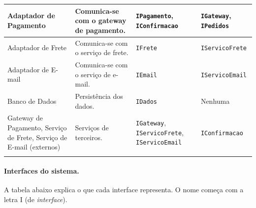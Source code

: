 \documentclass[12pt,a4paper]{article}
\begin{document}
{{\begin{xltabular}{\textwidth}{>{\raggedright\arraybackslash}p{2.7cm}|>{\raggedright\arraybackslash}X|>{\raggedright\arraybackslash}p{2.6cm}|>{\raggedright\arraybackslash}p{3.0cm}}
Adaptador de Pagamento & Comunica-se com o gateway de pagamento. & \texttt{IPagamento}, \texttt{IConfirmacao} & \texttt{IGateway}, \texttt{IPedidos}\\ \hline
Adaptador de Frete & Comunica-se com o serviço de frete. & \texttt{IFrete} & \texttt{IServicoFrete}\\ \hline
Adaptador de E-mail & Comunica-se com o serviço de e-mail. & \texttt{IEmail} & \texttt{IServicoEmail}\\ \hline
Banco de Dados & Persistência dos dados. & \texttt{IDados} & Nenhuma\\ \hline
Gateway de Pagamento, Serviço de Frete, Serviço de E-mail (externos) & Serviços de terceiros. & \texttt{IGateway}, \texttt{IServicoFrete}, \texttt{IServicoEmail} & \texttt{IConfirmacao}\\ \bottomrule
\end{xltabular}}
}

\paragraph{Interfaces do sistema.} A tabela abaixo explica o que cada interface representa. O nome começa com a letra I (de \emph{interface}).
\end{document}
